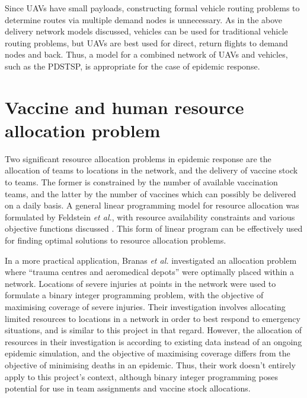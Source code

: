 Since UAVs have small payloads, constructing formal vehicle routing problems to determine routes via multiple demand nodes is unnecessary. As in the above delivery network models discussed, vehicles can be used for traditional vehicle routing problems, but UAVs are best used for direct, return flights to demand nodes and back. Thus, a model for a combined network of UAVs and vehicles, such as the PDSTSP, is appropriate for the case of epidemic response.

\section{Vaccine and human resource allocation problem}
\label{sec:lit_VaccHumRes}
Two significant resource allocation problems in epidemic response are the allocation of teams to locations in the network, and the delivery of vaccine stock to teams. The former is constrained by the number of available vaccination teams, and the latter by the number of vaccines which can possibly be delivered on a daily basis. A general linear programming model for resource allocation was formulated by Feldstein \textit{et al.}, with resource availability constraints and various objective functions discussed \cite{feldstein_1973}. This form of linear program can be effectively used for finding optimal solutions to resource allocation problems. 

In a more practical application, Branas \textit{et al.} \cite{branas2000trauma} investigated an allocation problem where ``trauma centres and aeromedical depots'' were optimally placed within a network. Locations of severe injuries at points in the network were used to formulate a binary integer programming problem, with the objective of maximising coverage of severe injuries. Their investigation involves allocating limited resources to locations in a network in order to best respond to emergency situations, and is similar to this project in that regard. However, the allocation of resources in their investigation is according to existing data instead of an ongoing epidemic simulation, and the objective of maximising coverage differs from the objective of minimising deaths in an epidemic. Thus, their work doesn't entirely apply to this project's context, although binary integer programming poses potential for use in team assignments and vaccine stock allocations.

